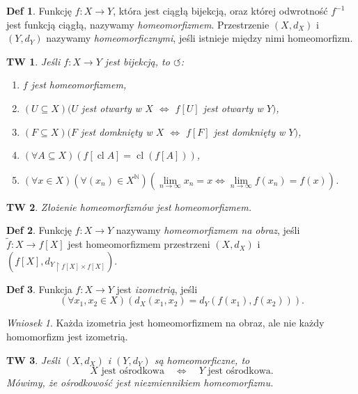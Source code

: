 \documentclass[a4paper, 12pt]{mwart}
\DeclareMathOperator{\cl}{cl}
\theoremstyle{definition}
\newtheorem{definicja}{Def}[section]
\theoremstyle{plain}
\newtheorem{twierdzenie}{TW}[section]
\theoremstyle{remark}
\newtheorem{wniosek}{Wniosek}[section]
\begin{document}
\begin{definicja}
	Funkcję $f\colon X \to Y$, która jest ciągłą bijekcją, oraz której odwrotność $f^{-1}$ jest funkcją ciągłą, nazywamy \emph{homeomorfizmem}.
	Przestrzenie $(X, d_X)$ i $(Y, d_Y)$ nazywamy \emph{homeomorficznymi}, jeśli istnieje między nimi homeomorfizm.
\end{definicja}
\begin{twierdzenie}
	Jeśli $f\colon X \to Y$ jest bijekcją, to $\circlearrowleft$:
	\begin{enumerate}
		\item $f$ jest homeomorfizmem,
		\item $\left(U \subseteq X\right)(U$ jest otwarty w $X$ \quad $\iff$ \quad $f[U]$ jest otwarty w $Y)$,
		\item $\left(F \subseteq X\right)(F$ jest domknięty w $X$ \quad $\iff$ \quad $f[F]$ jest domknięty w $Y)$,
		\item $\left(\forall A \subseteq X\right)\left(f[\cl A] = \cl (f[A])\right)$,
		\item $\left(\forall x \in X\right)\left(\forall (x_n) \in X^\mathbb{N}\right)\left(\lim\limits_{n \to \infty} x_n = x \iff \lim\limits_{n \to \infty} f(x_n) = f(x)\right)$.
	\end{enumerate}
\end{twierdzenie}
\begin{twierdzenie}
	Złożenie homeomorfizmów jest homeomorfizmem.
\end{twierdzenie}
\begin{definicja}
	Funkcję $f\colon X \to Y$ nazywamy \emph{homeomorfizmem na obraz}, jeśli $\tilde f \colon X \to f[X]$ jest homeomorfizmem przestrzeni $(X, d_X)$ i $(f[X], {d_Y}_{\restriction f[X] \times f[X]})$.
\end{definicja}
\begin{definicja}
	Funkcja $f\colon X \to Y$ jest \emph{izometrią}, jeśli
	\begin{equation}
		\left(\forall x_1, x_2 \in X\right)\left(d_X(x_1, x_2) = d_Y(f(x_1), f(x_2))\right).
	\end{equation}
\end{definicja}
\begin{wniosek}
	Każda izometria jest homeomorfizmem na obraz, ale nie każdy homomorfizm jest izometrią.
\end{wniosek}
\begin{twierdzenie}
	Jeśli $(X, d_X)$ i $(Y, d_Y)$ są homeomorficzne, to
	\begin{equation}
		X \text{ jest ośrodkowa} \quad \iff \quad Y \text{ jest ośrodkowa}.
	\end{equation}
	Mówimy, że \emph{ośrodkowość jest niezmiennikiem homeomorfizmu}.
\end{twierdzenie}
\end{document}
